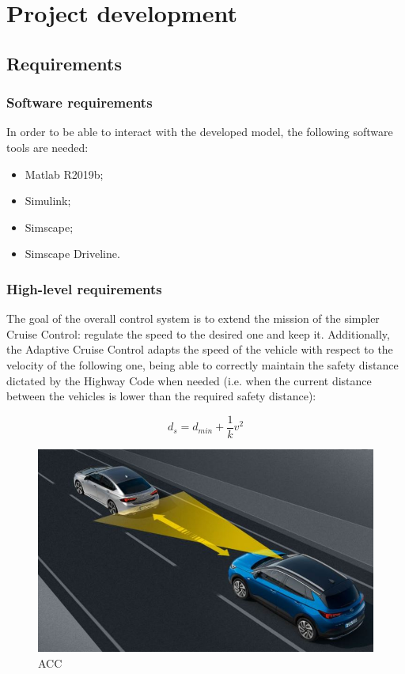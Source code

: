 \documentclass[12pt,a4paper]{report}
\begin{document}
\chapter{Project development}

\section{Requirements}
\subsection{Software requirements}

In order to be able to interact with the developed model, the following software tools are needed:

\begin{itemize}
	
	\item Matlab R2019b;
	
	\item Simulink;
	
	\item Simscape;
	
	\item Simscape Driveline.
	
\end{itemize}

\subsection{High-level requirements}

The goal of the overall control system is to extend the mission of the simpler Cruise Control: regulate the speed to the desired one and keep it. Additionally, the Adaptive Cruise Control adapts the speed of the vehicle with respect to the velocity of the following one, being able to correctly maintain the safety distance dictated by the Highway Code when needed (i.e. when the current distance between the vehicles is lower than the required safety distance):

\begin{equation*}
	d_s=d_{min}+\dfrac{1}{k}v^2
\end{equation*}

\begin{figure}[htbp]
	\centering
	\includegraphics{ACC.jpg}
	\caption{ACC}
\end{figure}
\end{document}
